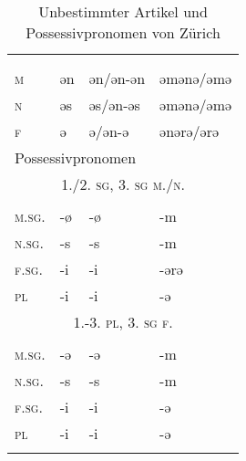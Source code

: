 \begin{table}[H]
	\caption{Unbestimmter Artikel und Possessivpronomen von Zürich \citep[104-107, 135-139]{Weber1987}}\label{table110}
	\begin{tabular}{llll}
		\lsptoprule
		\multicolumn{4}{l}{unbestimmter Artikel}\\\cmidrule(lr){1-4}
		& \NOM & \AKK & \DAT\\\midrule
		\textsc{m} & ən & ən/ən-ən & əmənə/əmə\\
		\textsc{n} & əs & əs/ən-əs & əmənə/əmə\\
		\textsc{f} & ə & ə/ən-ə & ənərə/ərə\\ \midrule
		\multicolumn{4}{l}{Possessivpronomen}\\
		\multicolumn{4}{c}{\scshape 1./2. \textsc{sg}, 3. \textsc{sg} m./n.} \\\cmidrule(lr){1-4}
		& \NOM & \AKK & \DAT\\\midrule
		\textsc{m.sg.} & {}-ø & {}-ø & {}-m\\
		\textsc{n.sg.} & {}-s & {}-s & {}-m\\
		\textsc{f.sg.} & {}-i & {}-i & {}-ərə\\
		\textsc{pl} & {}-i & {}-i & {}-ə\\ \midrule
		\multicolumn{4}{c}{\scshape 1.-3. \textsc{pl}, 3. \textsc{sg} f.} \\\cmidrule(lr){1-4}
		& \NOM & \AKK & \DAT\\\midrule
		\textsc{m.sg.} & {}-ə & {}-ə & {}-m\\
		\textsc{n.sg.} & {}-s & {}-s & {}-m\\
		\textsc{f.sg.} & {}-i & {}-i & {}-ə\\
		\textsc{pl} & {}-i & {}-i & {}-ə\\
		\lspbottomrule
	\end{tabular}
\end{table}


